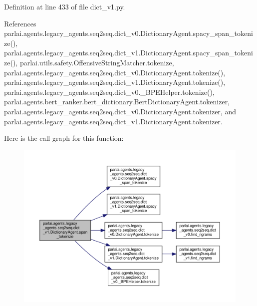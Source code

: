 Definition at line 433 of file dict\+\_\+v1.\+py.



References parlai.\+agents.\+legacy\+\_\+agents.\+seq2seq.\+dict\+\_\+v0.\+Dictionary\+Agent.\+spacy\+\_\+span\+\_\+tokenize(), parlai.\+agents.\+legacy\+\_\+agents.\+seq2seq.\+dict\+\_\+v1.\+Dictionary\+Agent.\+spacy\+\_\+span\+\_\+tokenize(), parlai.\+utils.\+safety.\+Offensive\+String\+Matcher.\+tokenize, parlai.\+agents.\+legacy\+\_\+agents.\+seq2seq.\+dict\+\_\+v0.\+Dictionary\+Agent.\+tokenize(), parlai.\+agents.\+legacy\+\_\+agents.\+seq2seq.\+dict\+\_\+v1.\+Dictionary\+Agent.\+tokenize(), parlai.\+agents.\+legacy\+\_\+agents.\+seq2seq.\+dict\+\_\+v0.\+\_\+\+B\+P\+E\+Helper.\+tokenize(), parlai.\+agents.\+bert\+\_\+ranker.\+bert\+\_\+dictionary.\+Bert\+Dictionary\+Agent.\+tokenizer, parlai.\+agents.\+legacy\+\_\+agents.\+seq2seq.\+dict\+\_\+v0.\+Dictionary\+Agent.\+tokenizer, and parlai.\+agents.\+legacy\+\_\+agents.\+seq2seq.\+dict\+\_\+v1.\+Dictionary\+Agent.\+tokenizer.

Here is the call graph for this function\+:
\nopagebreak
\begin{figure}[H]
\begin{center}
\leavevmode
\includegraphics[width=350pt]{classparlai_1_1agents_1_1legacy__agents_1_1seq2seq_1_1dict__v1_1_1DictionaryAgent_a0927c0c01fe0abd28964a992e42c0548_cgraph}
\end{center}
\end{figure}
\mbox{\label{classparlai_1_1agents_1_1legacy__agents_1_1seq2seq_1_1dict__v1_1_1DictionaryAgent_aed9556a06d40dbe376350c6c00694843}} 
